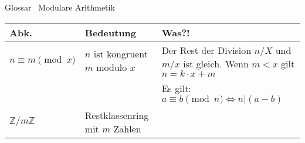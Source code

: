 \begin{frame}[fragile]{Glossar \textemdash\ Modulare Arithmetik}
    \small
    \begin{tabular}{p{} p{} p{}}
        \toprule
        Abk.                     & Bedeutung                        & Was?!                                                                                  \\
        \midrule
        $n \equiv m \pmod{x}$    & $n$ ist kongruent $m$ modulo $x$ & Der Rest der Division $n/X$ und $m/x$ ist gleich. Wenn $m < x$ gilt $n = k\cdot x + m$ \\
                                 &                                  & Es gilt: $a\equiv b \pmod n \iff n|(a-b)$                                              \\
        $\mathbb Z / m\mathbb Z$ & Restklassenring mit $m$ Zahlen   &                                                                                        \\
        \bottomrule
    \end{tabular}
\end{frame}